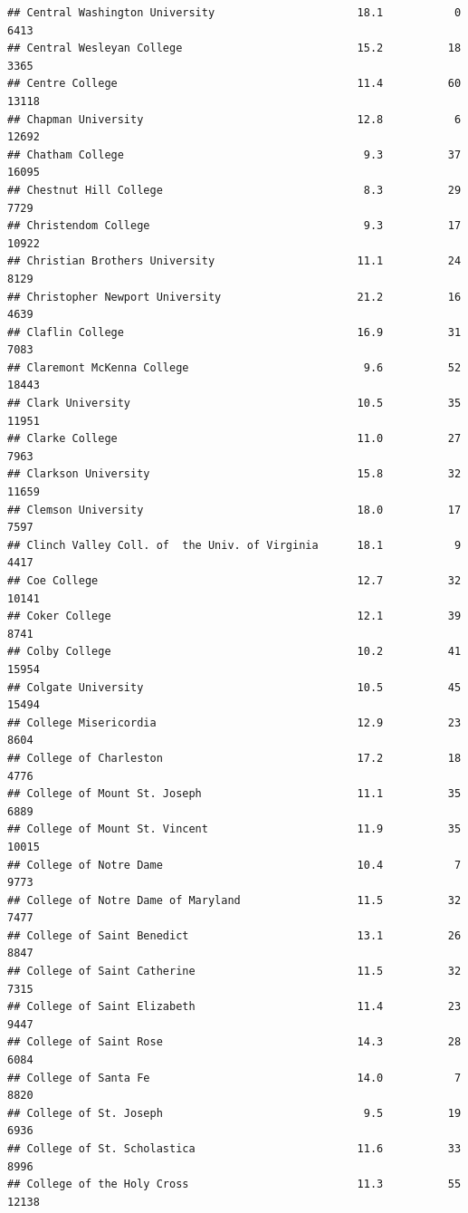 \documentclass[
]{article}
\begin{document}
\begin{verbatim}
## Central Washington University                      18.1           0   6413
## Central Wesleyan College                           15.2          18   3365
## Centre College                                     11.4          60  13118
## Chapman University                                 12.8           6  12692
## Chatham College                                     9.3          37  16095
## Chestnut Hill College                               8.3          29   7729
## Christendom College                                 9.3          17  10922
## Christian Brothers University                      11.1          24   8129
## Christopher Newport University                     21.2          16   4639
## Claflin College                                    16.9          31   7083
## Claremont McKenna College                           9.6          52  18443
## Clark University                                   10.5          35  11951
## Clarke College                                     11.0          27   7963
## Clarkson University                                15.8          32  11659
## Clemson University                                 18.0          17   7597
## Clinch Valley Coll. of  the Univ. of Virginia      18.1           9   4417
## Coe College                                        12.7          32  10141
## Coker College                                      12.1          39   8741
## Colby College                                      10.2          41  15954
## Colgate University                                 10.5          45  15494
## College Misericordia                               12.9          23   8604
## College of Charleston                              17.2          18   4776
## College of Mount St. Joseph                        11.1          35   6889
## College of Mount St. Vincent                       11.9          35  10015
## College of Notre Dame                              10.4           7   9773
## College of Notre Dame of Maryland                  11.5          32   7477
## College of Saint Benedict                          13.1          26   8847
## College of Saint Catherine                         11.5          32   7315
## College of Saint Elizabeth                         11.4          23   9447
## College of Saint Rose                              14.3          28   6084
## College of Santa Fe                                14.0           7   8820
## College of St. Joseph                               9.5          19   6936
## College of St. Scholastica                         11.6          33   8996
## College of the Holy Cross                          11.3          55  12138

\end{verbatim}
\end{document}
